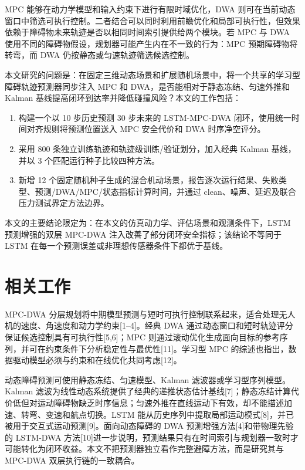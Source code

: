 \documentclass[10pt,a4paper,twocolumn]{ctexart}
\begin{document}
MPC 能够在动力学模型和输入约束下进行有限时域优化，DWA 则可在当前动态窗口中筛选可执行控制。二者结合可以同时利用前瞻优化和局部可执行性，但效果依赖于障碍物未来轨迹是否以相同时间索引提供给两个模块。若 MPC 与 DWA 使用不同的障碍物假设，规划器可能产生内在不一致的行为：MPC 预期障碍物将转弯，而 DWA 仍按静态或匀速轨迹筛选候选控制。

本文研究的问题是：在固定三维动态场景和扩展随机场景中，将一个共享的学习型障碍轨迹预测器同步注入 MPC 和 DWA，是否能相对于静态冻结、匀速外推和 Kalman 基线提高闭环到达率并降低碰撞风险？本文的工作包括：

\begin{enumerate}[leftmargin=*]
\item 构建一个以 10 步历史预测 30 步未来的 LSTM-MPC-DWA 闭环，使用统一时间对齐规则将预测位置送入 MPC 安全代价和 DWA 时序净空评分。
\item 采用 800 条独立训练轨迹和轨迹级训练/验证划分，加入经典 Kalman 基线，并以 3 个匹配运行种子比较四种方法。
\item 新增 12 个固定随机种子生成的混合机动场景，报告逐次运行结果、失败类型、预测/DWA/MPC/状态指标计算时间，并通过 clean、噪声、延迟及联合压力测试界定方法边界。
\end{enumerate}

本文的主要结论限定为：在本文的仿真动力学、评估场景和观测条件下，LSTM 预测增强的双层 MPC-DWA 注入改善了部分闭环安全指标；该结论不等同于 LSTM 在每一个预测误差或非理想传感器条件下都优于基线。

\section{相关工作}

MPC-DWA 分层规划将中期模型预测与短时可执行控制联系起来，适合处理无人机的速度、角速度和动力学约束[1–4]。经典 DWA 通过动态窗口和短时轨迹评分保证候选控制具有可执行性[5,6]；MPC 则通过滚动优化生成面向目标的参考序列，并可在约束条件下分析稳定性与最优性[11]。学习型 MPC 的综述也指出，数据驱动模型必须与约束和在线优化共同考虑[12]。

动态障碍预测可使用静态冻结、匀速模型、Kalman 滤波器或学习型序列模型。Kalman 滤波为线性动态系统提供了经典的递推状态估计基线[7]；静态冻结计算代价低但对运动障碍物缺乏时序信息；匀速外推在直线运动下有效，却不能描述加速、转弯、变速和航点切换。LSTM 能从历史序列中提取局部运动模式[8]，并已被用于交互式运动预测[9]。面向动态障碍的 DWA 预测增强方法[4]和带物理先验的 LSTM-DWA 方法[10]进一步说明，预测结果只有在时间索引与规划器一致时才可能转化为闭环收益。本文不把预测器独立看作完整避障方法，而是研究其与 MPC-DWA 双层执行链的一致耦合。
\end{document}
